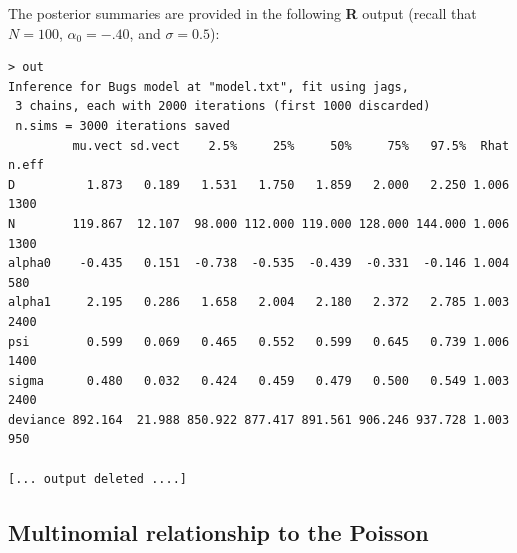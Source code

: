 The posterior summaries are provided in the following {\bf R}
output (recall that
$N=100$, $\alpha_{0}= -.40$, and $\sigma=0.5$):
{\small
\begin{verbatim}
> out
Inference for Bugs model at "model.txt", fit using jags,
 3 chains, each with 2000 iterations (first 1000 discarded)
 n.sims = 3000 iterations saved
         mu.vect sd.vect    2.5%     25%     50%     75%   97.5%  Rhat n.eff
D          1.873   0.189   1.531   1.750   1.859   2.000   2.250 1.006  1300
N        119.867  12.107  98.000 112.000 119.000 128.000 144.000 1.006  1300
alpha0    -0.435   0.151  -0.738  -0.535  -0.439  -0.331  -0.146 1.004   580
alpha1     2.195   0.286   1.658   2.004   2.180   2.372   2.785 1.003  2400
psi        0.599   0.069   0.465   0.552   0.599   0.645   0.739 1.006  1400
sigma      0.480   0.032   0.424   0.459   0.479   0.500   0.549 1.003  2400
deviance 892.164  21.988 850.922 877.417 891.561 906.246 937.728 1.003   950

[... output deleted ....]
\end{verbatim}
}


\subsection{Multinomial relationship to the Poisson}

